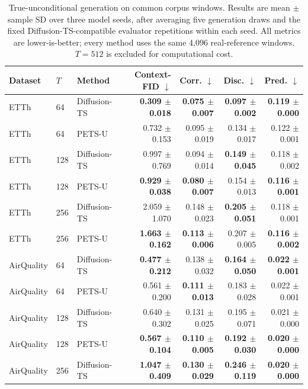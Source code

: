 \begin{table}[t]
\centering
\caption{True-unconditional generation on common corpus windows. Results are mean $\pm$ sample SD over three model seeds, after averaging five generation draws and the fixed Diffusion-TS-compatible evaluator repetitions within each seed. All metrics are lower-is-better; every method uses the same 4,096 real-reference windows. $T=512$ is excluded for computational cost.}
\label{tab:unconditional-main-audited}
\begin{tabular}{lllrrrr}
\toprule
Dataset & $T$ & Method & Context-FID $\downarrow$ & Corr. $\downarrow$ & Disc. $\downarrow$ & Pred. $\downarrow$ \\
\midrule
ETTh & 64 & Diffusion-TS & \textbf{0.309 $\pm$ 0.018} & \textbf{0.075 $\pm$ 0.007} & \textbf{0.097 $\pm$ 0.002} & \textbf{0.119 $\pm$ 0.000} \\
ETTh & 64 & PETS-U & 0.732 $\pm$ 0.153 & 0.095 $\pm$ 0.019 & 0.134 $\pm$ 0.017 & 0.122 $\pm$ 0.001 \\
\addlinespace
ETTh & 128 & Diffusion-TS & 0.997 $\pm$ 0.769 & 0.094 $\pm$ 0.014 & \textbf{0.149 $\pm$ 0.045} & 0.118 $\pm$ 0.002 \\
ETTh & 128 & PETS-U & \textbf{0.929 $\pm$ 0.038} & \textbf{0.080 $\pm$ 0.007} & 0.154 $\pm$ 0.013 & \textbf{0.116 $\pm$ 0.001} \\
\addlinespace
ETTh & 256 & Diffusion-TS & 2.059 $\pm$ 1.070 & 0.148 $\pm$ 0.023 & \textbf{0.205 $\pm$ 0.051} & 0.118 $\pm$ 0.001 \\
ETTh & 256 & PETS-U & \textbf{1.663 $\pm$ 0.162} & \textbf{0.113 $\pm$ 0.006} & 0.207 $\pm$ 0.005 & \textbf{0.116 $\pm$ 0.002} \\
\addlinespace
AirQuality & 64 & Diffusion-TS & \textbf{0.477 $\pm$ 0.212} & 0.138 $\pm$ 0.032 & \textbf{0.164 $\pm$ 0.050} & \textbf{0.022 $\pm$ 0.001} \\
AirQuality & 64 & PETS-U & 0.561 $\pm$ 0.200 & \textbf{0.111 $\pm$ 0.013} & 0.183 $\pm$ 0.028 & 0.022 $\pm$ 0.001 \\
\addlinespace
AirQuality & 128 & Diffusion-TS & 0.640 $\pm$ 0.302 & 0.131 $\pm$ 0.025 & 0.195 $\pm$ 0.071 & 0.021 $\pm$ 0.000 \\
AirQuality & 128 & PETS-U & \textbf{0.567 $\pm$ 0.104} & \textbf{0.110 $\pm$ 0.005} & \textbf{0.192 $\pm$ 0.030} & \textbf{0.020 $\pm$ 0.000} \\
\addlinespace
AirQuality & 256 & Diffusion-TS & \textbf{1.047 $\pm$ 0.409} & \textbf{0.130 $\pm$ 0.029} & \textbf{0.246 $\pm$ 0.119} & \textbf{0.020 $\pm$ 0.000} \\

\end{tabular}
\end{table}
